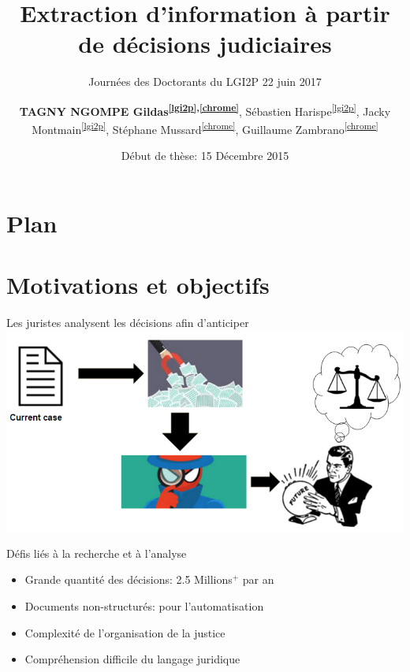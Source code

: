 \documentclass[newPxFont,pagenumber]{beamer}
\title{\normalsize Extraction d'information à partir de décisions judiciaires}
\subtitle{\small Journées des Doctorants du LGI2P 22 juin 2017}
\date{Début de thèse: 15 Décembre 2015}
\author{\textbf{TAGNY NGOMPE Gildas\textsuperscript{\ref{lgi2p},\ref{chrome}}}, Sébastien Harispe\textsuperscript{\ref{lgi2p}}, Jacky Montmain\textsuperscript{\ref{lgi2p}}, Stéphane Mussard\textsuperscript{\ref{chrome}}, Guillaume Zambrano\textsuperscript{\ref{chrome}}}
\institute{%
\begin{enumerate}
\item LGI2P (École des mines d'Alès) \label{lgi2p}
\item CHROME EA 7352 (Université de Nîmes) \label{chrome}
\end{enumerate}
}
\makeatletter
\newcommand*{\currentname}{\@currentlabelname}
\makeatother
\begin{document}
\nocite{}
%
%
\begin{frame}[plain]
	\titlepage
\end{frame}
%
%
\section*{Plan}
\begin{frame}[c]{\currentname}
\tableofcontents[hideallsubsections]
\end{frame}

\section{Motivations et objectifs}

\begin{frame}[c]{Les juristes analysent les décisions afin d'anticiper}
\includegraphics[width=\textwidth]{lawyerwork.PNG}
\end{frame}

\begin{frame}{Défis liés à la recherche et à l'analyse}
\begin{itemize}
\item Grande quantité des décisions: 2.5 Millions$^+$ par an
\item Documents non-structurés: pour l'automatisation
\item Complexité de l'organisation de la justice 
\item Compréhension difficile du langage juridique
\end{itemize}
\end{frame}
\end{document}
